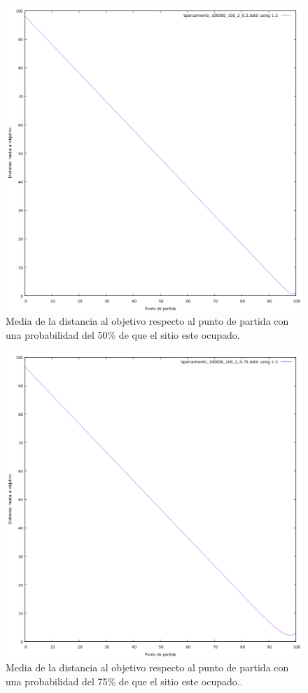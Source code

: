 \documentclass[12pt, spanish]{article}
\begin{document}
\begin{figure}[H]
	\centering
	\includegraphics[scale = 0.6]{aparcamiento_100000_100_2_0-50.png}
	\caption{Media de la distancia al objetivo respecto al punto de partida con una probabilidad del 50\% de que el sitio este ocupado.}
	\label{fig:ej4}
\end{figure}

\begin{figure}[H]
	\centering
	\includegraphics[scale = 0.6]{aparcamiento_100000_100_2_0-75.png}
	\caption{Media de la distancia al objetivo respecto al punto de partida con una probabilidad del 75\% de que el sitio este ocupado..}
	\label{fig:ej4}
\end{figure}
\end{document}
